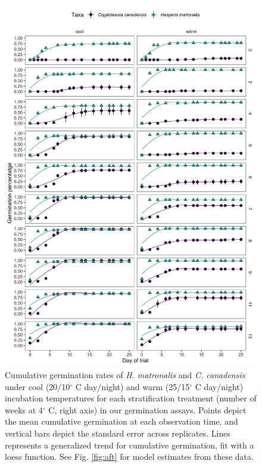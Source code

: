 \documentclass{article}[11pt]
\begin{document}
\begin{figure}[h!]
    \centering
\includegraphics[width=.75\textwidth]{..//figure/crp_hesp2.jpeg}
\caption{Cumulative germination rates of \textit{H. matronalis} and \textit{C. canadensis} under cool (20/10$^{\circ}$ C day/night) and warm (25/15$^{\circ}$ C day/night) incubation temperatures for each stratification treatment (number of weeks at 4$^{\circ}$ C, right axis) in our germination assays. Points depict the mean cumulative germination at each observation time, and vertical bars depict the standard error across replicates. Lines represents a generalized trend for cumulative germination, fit with a loess function. See Fig. \ref{fig:aft} for model estimates from these data.}%
   \label{fig:timecourse}
\end{figure}
\end{document}
